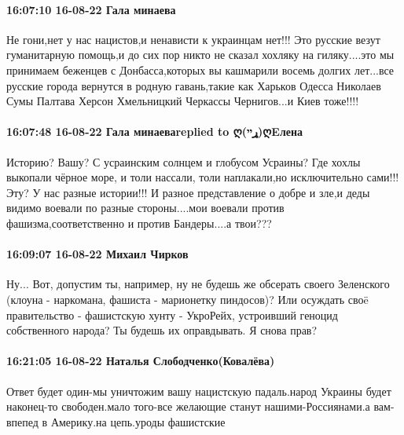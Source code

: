 \paragraph{16:07:10 16-08-22 Гала минаева}

Не гони,нет у нас нацистов,и ненависти к украинцам нет!!! Это русские везут
гуманитарную помощь,и до сих пор никто не сказал хохляку на гиляку....это мы
принимаем беженцев с Донбасса,которых вы кашмарили восемь долгих лет...все
русские города вернутся в родную гавань,такие как Харьков Одесса Николаев Сумы
Палтава Херсон Хмельницкий Черкассы Чернигов...и Киев тоже!!!!

\paragraph{16:07:48 16-08-22 Гала минаеваreplied to ღ(ړײ)ღEлена}

Историю? Вашу? С усраинским солнцем и глобусом Усраины? Где хохлы выкопали
чёрное море, и толи нассали, толи наплакали,но исключительно сами!!! Эту? У нас
разные истории!!! И разное представление о добре и зле,и деды видимо воевали по
разные стороны....мои воевали против фашизма,соответственно и против
Бандеры....а твои???

\paragraph{16:09:07 16-08-22 Михаил Чирков}

Ну... Вот, допустим ты, например, ну не будешь же обсерать своего Зеленского (клоуна - наркомана, фашиста - марионетку пиндосов)?
Или осуждать своë правительство - фашистскую хунту - УкроРейх, устроивший геноцид собственного народа?
Ты будешь их оправдывать.
Я снова прав?

\paragraph{16:21:05 16-08-22 Наталья Слободченко(Ковалёва)}

Ответ будет один-мы уничтожим вашу нацистскую падаль.народ Украины будет
наконец-то свободен.мало того-все желающие станут нашими-Россиянами.а
вам-впепед в Америку.на цепь.уроды фашистские
